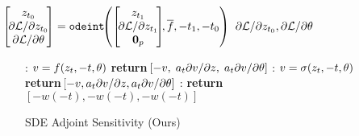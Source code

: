 \documentclass[twoside]{article}
\begin{document}
\begin{figure*}[h!]
\begin{minipage}[t]{0.49\linewidth}
\begin{algorithm}[H]
\begin{algorithmic}
				\vspace{24mm}
				\vspace{.75mm}
				$\!\!\!\!\!\!\!\!\!\!\!\!\left[
				\begin{array}{c}
				\!\!\!\! \sol_\tstart \!\!\!\! \\
				\!\!\!\! {\partial \loss}/{\partial \sol_\tstart} \!\!\!\!\\
				\!\!\!\!  {\partial \loss}/{\partial \theta} \!\!\!\!
				\end{array} \right] = \textnormal{\texttt{odeint}}
				\!\!\left( \left[
				\begin{array}{c}
				\!\!\!\! \sol_\tend \!\!\!\! \\
				\!\!\!\! {\partial \loss}/{\partial \sol_\tend} \!\!\!\!\\
				\!\!\!\!  {\vzero}_p \!\!\!\!
				\end{array} \right]\!\!,
				\textnormal{$\overline f$}, -\tend, -\tstart \right)$
				\Ensure ${\partial \mathcal{L}}/{\partial z_{t_\textnormal{0}}}, {\partial \mathcal{L}}/{\partial \theta }$
			\end{algorithmic}
		\end{algorithm}\end{minipage}
	\hfill
	\begin{minipage}[t]{0.49\linewidth}
		\begin{algorithm}[H]
			\centering
			\caption{ \footnotesize{SDE Adjoint Sensitivity (Ours)} } \label{algo:overall}
			\begin{algorithmic}
\vspace{1.25mm}
				:  
				\State $v = f(z_t, -t, \theta)$
				\State \textbf{return} $\![
				-v, \;
				a_t {\partial v}/{\partial z}, \;
				a_t {\partial v}/{\partial \theta}]$ 
				\EndFunction
				\vspace{.75mm}
				{\color{myfavblue}
					:
					\State $v = \sigma(z_t, -t, \theta)$
					\State \textbf{return} $\![
					-v,
					a_t {\partial v}/{\partial z},
					a_t {\partial v}/{\partial \theta}]$ 
					\EndFunction}
				\vspace{.75mm}
				{\color{myfavblue}
					:
					\State \textbf{return} $\![{-w(-t)}, {-w(-t)}, {-w(-t)}]$ 
					\EndFunction}



\end{algorithmic}
\end{algorithm}
\end{minipage}
\end{figure*}
\end{document}

